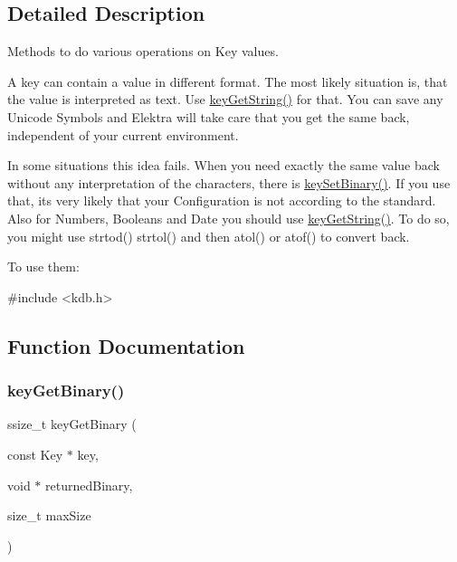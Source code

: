 \subsection{Detailed Description}
Methods to do various operations on Key values. 

A key can contain a value in different format. The most likely situation is, that the value is interpreted as text. Use \hyperlink{group__keyvalue_ga41b9fac5ccddafe407fc0ae1e2eb8778}{key\+Get\+String()} for that. You can save any Unicode Symbols and Elektra will take care that you get the same back, independent of your current environment.

In some situations this idea fails. When you need exactly the same value back without any interpretation of the characters, there is \hyperlink{group__keyvalue_gaa50a5358fd328d373a45f395fa1b99e7}{key\+Set\+Binary()}. If you use that, its very likely that your Configuration is not according to the standard. Also for Numbers, Booleans and Date you should use \hyperlink{group__keyvalue_ga41b9fac5ccddafe407fc0ae1e2eb8778}{key\+Get\+String()}. To do so, you might use strtod() strtol() and then atol() or atof() to convert back.

To use them\+: 
\begin{DoxyCode}
\textcolor{preprocessor}{#include <kdb.h>}
\end{DoxyCode}
 

\subsection{Function Documentation}
\mbox{\label{group__keyvalue_ga4c0d8a4a11174197699c231e0b5c3c84}} 
\subsubsection{\texorpdfstring{key\+Get\+Binary()}{keyGetBinary()}}
{\footnotesize\ttfamily ssize\+\_\+t key\+Get\+Binary (\begin{DoxyParamCaption}\item[{const Key $\ast$}]{key,  }\item[{void $\ast$}]{returned\+Binary,  }\item[{size\+\_\+t}]{max\+Size }\end{DoxyParamCaption})}



